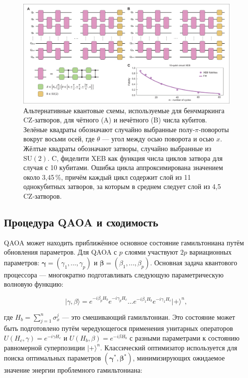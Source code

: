 \begin{figure}
    \centering
    \includegraphics[scale=0.35]{inc/fig_05.png}
    \caption{
    Альтернативные квантовые схемы, используемые для бенчмаркинга CZ‑затворов,
    для чётного (A) и нечётного (B) числа кубитов. Зелёные квадраты обозначают
    случайно выбранные полу‑$\pi$‑повороты вокруг восьми осей, где $\theta$ —
    угол между осью поворота и осью $x$. Жёлтые квадраты обозначают затворы,
    случайно выбранные из $\mathrm{SU}(2)$. C, фиделити XEB как функция числа
    циклов затвора для случая с 10 кубитами. Ошибка цикла аппроксимирована
    значением около 3{,}45\,\%, причём каждый цикл содержит слой из 11
    однокубитных затворов, за которым в среднем следует слой из 4{,}5
    CZ‑затворов.
    }
    \label{fig:fig05}
\end{figure}

\subsection*{Процедура QAOA и сходимость}

QAOA может находить приближённое основное состояние гамильтониана путём
обновления параметров. Для QAOA с $p$ слоями участвуют $2p$ вариационных
параметров: $\boldsymbol{\gamma} = (\gamma_1, ..., \gamma_p)$ и
$\boldsymbol{\beta} = (\beta_1, ..., \beta_p)$. Основная задача квантового
процессора — многократно подготавливать следующую параметрическую волновую
функцию:

\begin{equation}
\lvert \gamma, \beta \rangle
      = e^{-i\beta_{p} H_{b}}
        e^{-i\gamma_{p} H_{c}}
        \dots
        e^{-i\beta_{1} H_{b}}
        e^{-i\gamma_{1} H_{c}}
        \lvert + \rangle^{n},
\end{equation}

\noindent где $H_b = \sum_{j=1}^{n} \sigma_x^j$ — это смешивающий гамильтониан. Это
состояние может быть подготовлено путём чередующегося применения унитарных
операторов $U(H_c, \gamma) = e^{-i\gamma H_c}$ и $U(H_b, \beta) = e^{-i\beta
H_b}$ с разными параметрами к состоянию равномерной суперпозиции $\lvert +
\rangle^{n}$. Классический оптимизатор используется для поиска оптимальных
параметров $(\boldsymbol{\gamma}^*, \boldsymbol{\beta}^*)$, минимизирующих
ожидаемое значение энергии проблемного гамильтониана:

